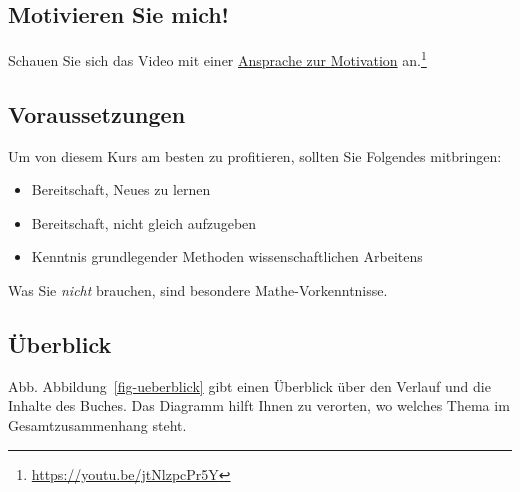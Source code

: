 \documentclass[
  a4paper,
  DIV=11]{scrreprt}
\providecommand{\tightlist}{%
  \setlength{\itemsep}{0pt}\setlength{\parskip}{0pt}}\usepackage{longtable,booktabs,array}
\begin{document}
\subsection{Motivieren Sie mich!}\label{motivieren-sie-mich}

Schauen Sie sich das Video mit einer
\href{https://youtu.be/jtNlzpcPr5Y}{Ansprache zur Motivation}
an.\footnote{\url{https://youtu.be/jtNlzpcPr5Y}}

\subsection{Voraussetzungen}\label{voraussetzungen}

Um von diesem Kurs am besten zu profitieren, sollten Sie Folgendes
mitbringen:

\begin{itemize}
\tightlist
\item
  Bereitschaft, Neues zu lernen
\item
  Bereitschaft, nicht gleich aufzugeben
\item
  Kenntnis grundlegender Methoden wissenschaftlichen Arbeitens
\end{itemize}

Was Sie \emph{nicht} brauchen, sind besondere Mathe-Vorkenntnisse.

\subsection{Überblick}\label{uxfcberblick}

Abb. Abbildung~\ref{fig-ueberblick} gibt einen Überblick über den
Verlauf und die Inhalte des Buches. Das Diagramm hilft Ihnen zu
verorten, wo welches Thema im Gesamtzusammenhang steht.
\end{document}
